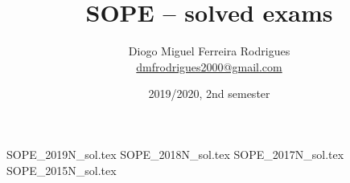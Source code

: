 \documentclass{sope}
\title{SOPE -- solved exams}
\author{Diogo Miguel Ferreira Rodrigues \\ \href{mailto:dmfrodrigues2000@gmail.com}{dmfrodrigues2000@gmail.com}}
\date{2019/2020, 2nd semester}
\begin{document}
\frontmatter
\maketitle
\secondpage
\setcounter{tocdepth}{2}
\tableofcontents
\mainmatter
{SOPE_2019N_sol.tex}
{SOPE_2018N_sol.tex}
{SOPE_2017N_sol.tex}
{SOPE_2015N_sol.tex}
\end{document}
